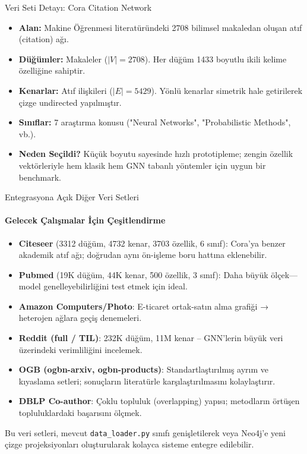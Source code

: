 \documentclass{beamer}
\begin{document}
\begin{frame}{Veri Seti Detayı: Cora Citation Network}
    \begin{itemize}
        \item \textbf{Alan:} Makine Öğrenmesi literatüründeki 2708 bilimsel makaledan oluşan atıf (citation) ağı.
        \item \textbf{Düğümler:} Makaleler ($|V| = 2708$). Her düğüm 1433 boyutlu ikili kelime özelliğine sahiptir.
        \item \textbf{Kenarlar:} Atıf ilişkileri ($|E| = 5429$). Yönlü kenarlar simetrik hale getirilerek çizge undirected yapılmıştır.
        \item \textbf{Sınıflar:} 7 araştırma konusu ("Neural Networks", "Probabilistic Methods", vb.).
        \item \textbf{Neden Seçildi?} Küçük boyutu sayesinde hızlı prototipleme; zengin özellik vektörleriyle hem klasik hem GNN tabanlı yöntemler için uygun bir benchmark.
    \end{itemize}
\end{frame}

\begin{frame}{Entegrasyona Açık Diğer Veri Setleri}
\framesubtitle{Gelecek Çalışmalar İçin Çeşitlendirme}
    \begin{itemize}
        \item \textbf{Citeseer} \small(3312 düğüm, 4732 kenar, 3703 özellik, 6 sınıf)\normalsize: Cora'ya benzer akademik atıf ağı; doğrudan aynı ön-işleme boru hattına eklenebilir.
        \item \textbf{Pubmed} \small(19K düğüm, 44K kenar, 500 özellik, 3 sınıf)\normalsize: Daha büyük ölçek—model genelleyebilirliğini test etmek için ideal.
        \item \textbf{Amazon Computers/Photo}: E-ticaret ortak-satın alma grafiği → heterojen ağlara geçiş denemeleri.
        \item \textbf{Reddit (full / TIL)}: 232K düğüm, 11M kenar – GNN'lerin büyük veri üzerindeki verimliliğini incelemek.
        \item \textbf{OGB (ogbn-arxiv, ogbn-products)}: Standartlaştırılmış ayrım ve kıyaslama setleri; sonuçların literatürle karşılaştırılmasını kolaylaştırır.
        \item \textbf{DBLP Co-author}: Çoklu topluluk (overlapping) yapısı; metodların örtüşen topluluklardaki başarısını ölçmek.
    \end{itemize}
    \vspace{0.3cm}
    Bu veri setleri, mevcut \texttt{data\_loader.py} sınıfı genişletilerek veya Neo4j'e yeni çizge projeksiyonları oluşturularak kolayca sisteme entegre edilebilir.
\end{frame}
\end{document}
